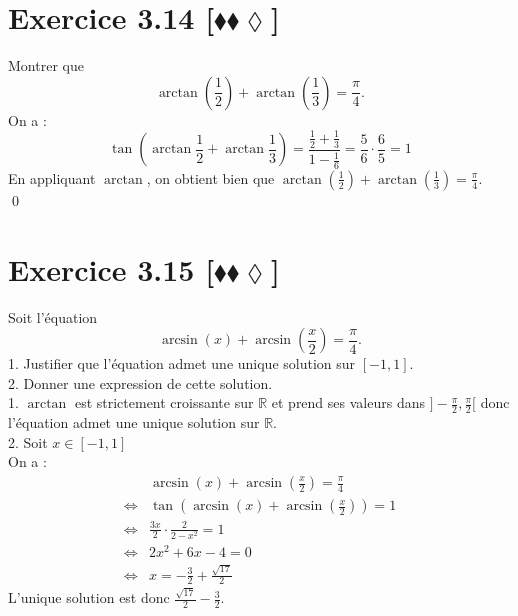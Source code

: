 \documentclass[10pt]{article}
\begin{document}

\section*{Exercice 3.14 [$\blacklozenge\blacklozenge\lozenge$]}
\begin{tcolorbox}[enhanced, width=6in, center, size=fbox, fontupper=\large, drop shadow southwest]
    Montrer que
    \begin{equation*}
        \arctan\left(\frac{1}{2}\right)+\arctan\left(\frac{1}{3}\right)=\frac{\pi}{4}.
    \end{equation*}
    On a :
    \begin{equation*}
        \tan\left(\arctan\frac{1}{2}+\arctan\frac{1}{3}\right)
        =\frac{\frac{1}{2}+\frac{1}{3}}{1-\frac{1}{6}}
        =\frac{5}{6}\cdot\frac{6}{5}
        =1
    \end{equation*}
    En appliquant $\arctan$, on obtient bien que $\arctan\left(\frac{1}{2}\right)+\arctan\left(\frac{1}{3}\right)=\frac{\pi}{4}.$\\
    \qed
\end{tcolorbox}


\section*{Exercice 3.15 [$\blacklozenge\blacklozenge\lozenge$]}
\begin{tcolorbox}[enhanced, width=6in, center, size=fbox, fontupper=\large, drop shadow southwest]
    Soit l'équation
    \begin{equation*}
        \arcsin(x)+\arcsin\left(\frac{x}{2}\right)=\frac{\pi}{4}.
    \end{equation*}
    1. Justifier que l'équation admet une unique solution sur $[-1,1]$.\\
    2. Donner une expression de cette solution.\\[0.25cm]
    1. $\arctan$ est strictement croissante sur $\mathbb{R}$ et prend ses valeurs dans $]-\frac{\pi}{2},\frac{\pi}{2}[$ donc l'équation admet une unique solution sur $\mathbb{R}$.\\[0.25cm]
    2. Soit $x\in[-1,1]$\\
    On a :
    \begin{align*}
        &\arcsin(x)+\arcsin(\frac{x}{2})=\frac{\pi}{4}\\
        \iff&\tan(\arcsin(x)+\arcsin(\frac{x}{2}))=1\\
        \iff&\frac{3x}{2}\cdot\frac{2}{2-x^2}=1\\
        \iff&2x^2+6x-4=0\\
        \iff&x=-\frac{3}{2}+\frac{\sqrt{17}}{2}
    \end{align*}
    L'unique solution est donc $\frac{\sqrt{17}}{2}-\frac{3}{2}$.
\end{tcolorbox}
\end{document}
